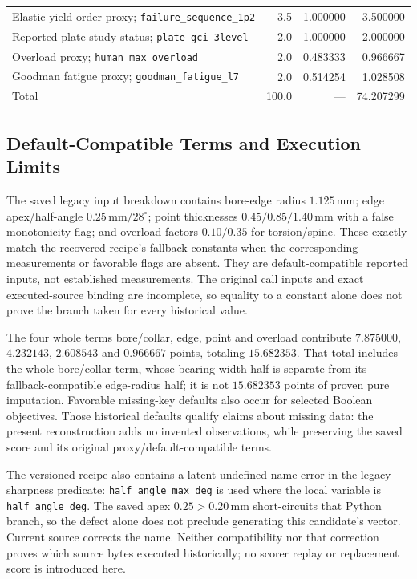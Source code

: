 \begin{table}[t]
\begin{tabular}{@{}>{\raggedright\arraybackslash}p{}rrr@{}}
Elastic yield-order proxy; \nolinkurl{failure_sequence_1p2} & 3.5 & 1.000000 & 3.500000 \\
Reported plate-study status; \nolinkurl{plate_gci_3level} & 2.0 & 1.000000 & 2.000000 \\
Overload proxy; \nolinkurl{human_max_overload} & 2.0 & 0.483333 & 0.966667 \\
Goodman fatigue proxy; \nolinkurl{goodman_fatigue_l7} & 2.0 & 0.514254 & 1.028508 \\
\midrule
Total & 100.0 & --- & 74.207299 \\
\bottomrule
\end{tabular}
\end{table}

\subsection{Default-Compatible Terms and Execution Limits}
The saved legacy input breakdown contains bore-edge radius $1.125\,\mathrm{mm}$; edge apex/half-angle $0.25\,\mathrm{mm}/28^\circ$; point thicknesses $0.45/0.85/1.40\,\mathrm{mm}$ with a false monotonicity flag; and overload factors $0.10/0.35$ for torsion/spine. These exactly match the recovered recipe's fallback constants when the corresponding measurements or favorable flags are absent. They are default-compatible reported inputs, not established measurements. The original call inputs and exact executed-source binding are incomplete, so equality to a constant alone does not prove the branch taken for every historical value.

The four whole terms bore/collar, edge, point and overload contribute $7.875000$, $4.232143$, $2.608543$ and $0.966667$ points, totaling $15.682353$. That total includes the whole bore/collar term, whose bearing-width half is separate from its fallback-compatible edge-radius half; it is not $15.682353$ points of proven pure imputation. Favorable missing-key defaults also occur for selected Boolean objectives. Those historical defaults qualify claims about missing data: the present reconstruction adds no invented observations, while preserving the saved score and its original proxy/default-compatible terms.

The versioned recipe also contains a latent undefined-name error in the legacy sharpness predicate: \nolinkurl{half_angle_max_deg} is used where the local variable is \nolinkurl{half_angle_deg}. The saved apex $0.25>0.20\,\mathrm{mm}$ short-circuits that Python  branch, so the defect alone does not preclude generating this candidate's vector. Current source corrects the name. Neither compatibility nor that correction proves which source bytes executed historically; no scorer replay or replacement score is introduced here.

